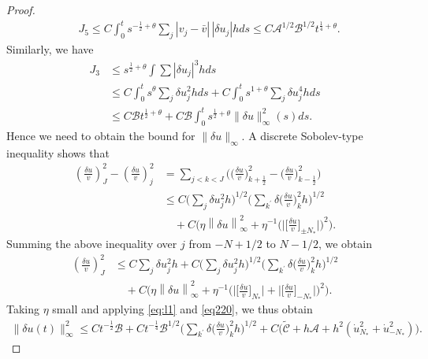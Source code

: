 \documentclass[a4paper,oneside,11pt]{article}
\numberwithin{equation}{section}
\begin{document}
\begin{proof}
\begin{align}
	&J_5\leq C\int_0^ts^{-\frac{1}{2}+\theta}\sum_{j}|v_j-\bar v|\,|\delta u_j| hds%
	\leq C\mathscr{A}^{1/2}\mathscr{B}^{1/2}t^{\frac{1}{4}+\theta}.\label{eq:ux-j5}
\end{align}
Similarly, we have
\begin{equation}\label{eq:ux-j3}
\begin{aligned}
J_3&\leq s^{\frac{1}{2}+\theta}\int\sum |\delta u_{j}|^{3}hds  \\
&\leq C\int_{0}^{t}s^{\theta}\sum_{j}\delta u_{j}^{2}hds+C\int_{0}^{t}s^{1+\theta}\sum_{j}\delta u_{j}^{4}hds \\
&\leq C\mathscr{B}t^{\frac{1}{2}+\theta}+C\mathscr{B}\int_{0}^{t}s^{\frac12+\theta}\|\delta u\|_{\infty}^2(s)ds.
\end{aligned}	
\end{equation}
Hence we need to obtain the bound for \(\|\delta u\|_{\infty}\). A discrete Sobolev-type inequality shows that
\[\begin{aligned}
\left({\frac{\delta u}{v}}\right)_J^{2}-\left({\frac{\delta u}{v}}\right)_j^{2}& =\sum_{j<k<J}\Big(\big(\frac{\delta u}{v}\big)_{k+\frac{1}{2}}^{2}-\big(\frac{\delta u}{v}\big)_{k-\frac{1}{2}}^{2}\Big) \\
&\leq C\Big(\sum_{j}\delta u_{j}^{2}h\Big)^{1/2}\Big(\sum_{k^{\prime}}\delta\big(\frac{\delta u}{v}\big)_{k}^{2}h\Big)^{1/2} \\
&\quad+C\Big(\eta\left\|\delta u\right\|_{\infty}^{2}+\eta^{-1}\big(\big|\big[\frac{\delta u}{v}\big]_{\pm N_* }\big|\big)^{2}\Big).
\end{aligned}\]
Summing the above inequality over $j$ from $-N+1/2$ to $N-1/2$, we obtain
\[\begin{aligned}
\left({\frac{\delta u}{v}}\right)_J^{2}&\leq C\sum_{j}\delta u_{j}^{2}h+
 C\Big(\sum_{j}\delta u_{j}^{2}h\Big)^{1/2}\Big(\sum_{k^{\prime}}\delta\big(\frac{\delta u}{v}\big)_{k}^{2}h\Big)^{1/2} \\
&\quad+C\Big(\eta\left\|\delta u\right\|_{\infty}^{2}+\eta^{-1}\big(\big|\big[\frac{\delta u}{v}\big]_{N_* }\big|+\big|\big[\frac{\delta u}{v}\big]_{-N_* }\big|\big)^{2}\Big).
\end{aligned}\]
Taking $\eta$ small and applying \eqref{eq:l1} and \eqref{eq220}, we thus obtain
\begin{equation}\label{eq:ux-infty}
\begin{aligned}
\|\delta u(t)\|_{\infty}^{2}\leq Ct^{-\frac12}\mathscr{B}+Ct^{-\frac14}\mathscr{B}^{1/2}\Big(\sum_{k^{\prime}}\delta\big(\frac{\delta u}{v}\big)_{k}^{2}h\Big)^{1/2}+C\big(\tilde{\mathscr{C}}+ h\mathscr{A}+h^{2}(\dot{u}_{N_* }^{2}+\dot{u}_{-N_* }^{2})\big).

\end{aligned}
\end{equation}
\end{proof}
\end{document}
